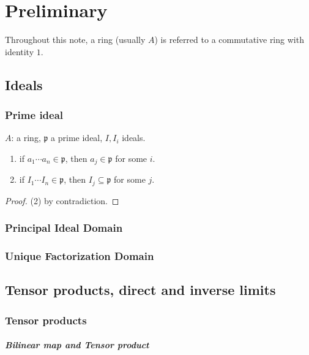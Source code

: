 \chapter{Preliminary}
Throughout this note, a ring (usually \( A \)) is referred to a commutative ring with identity \( 1 \).

\section{Ideals}

\subsection{Prime ideal}

\begin{proposition}
  \( A \): a ring, \( \mathfrak{p} \) a prime ideal, \( I, I_i \) ideals.
  \begin{enumerate}
    \item if \( a_1 \cdots a_n \in \mathfrak{p} \), then \( a_j \in \mathfrak{p}
      \) for some \( i \).
    \item if \( I_1 \cdots I_n \in \mathfrak{p} \), then \( I_j \subseteq
      \mathfrak{p} \) for some \( j \).
  \end{enumerate}
\end{proposition}
\begin{proof}
  (2) by contradiction.
\end{proof}

\subsection{Principal Ideal Domain}

\subsection{Unique Factorization Domain}

\section{Tensor products, direct and inverse limits}

\subsection{Tensor products}

\paragraph{Bilinear map and Tensor product}


